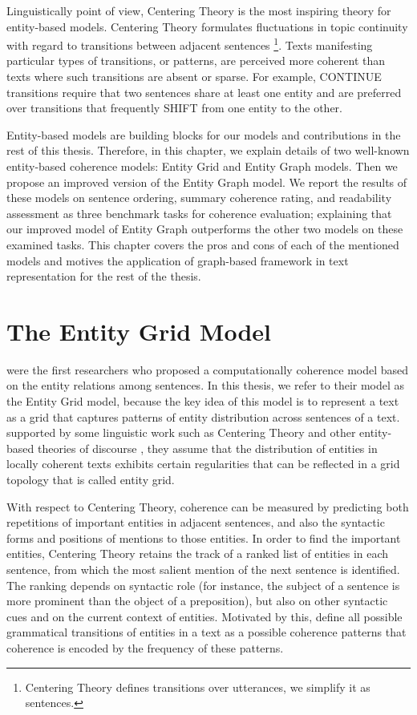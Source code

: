 Linguistically point of view, Centering Theory \cite{grosz95} is the most inspiring theory for entity-based models.  
Centering Theory formulates fluctuations in topic continuity with regard to transitions between adjacent sentences 
\footnote{Centering Theory defines transitions over utterances, we simplify it as sentences.}.
Texts manifesting particular types of transitions, or patterns, are perceived more coherent than texts where such transitions are absent or sparse. For example, CONTINUE transitions require that two sentences share at least one entity and are preferred
over transitions that frequently SHIFT from one entity to the other. 

Entity-based models are building blocks for our models and contributions in the rest of this thesis. 
Therefore, in this chapter, we explain details of two well-known entity-based coherence models: Entity Grid and Entity Graph models. 
Then we propose an improved version of the Entity Graph model.  
We report the results of these models on sentence ordering, summary coherence rating, and readability assessment as three benchmark tasks for coherence evaluation; explaining that our improved model of Entity Graph outperforms the other two models on these examined tasks. 
This chapter covers the pros and cons of each of the mentioned models and motives the application of graph-based framework in text representation for the rest of the thesis. 


\section{The Entity Grid Model}
\label{sec:ent_grid}
%
 were the first researchers who proposed a computationally coherence model based on the entity relations among sentences. 
In this thesis, we refer to their model as the Entity Grid model,  
because the key idea of this model is to represent a text as a grid that captures patterns of entity distribution across sentences of a text. 
supported by some linguistic work such as Centering Theory \cite{grosz95} and other entity-based theories of discourse \cite{givon87,prince81a}, they assume that the distribution of entities in locally coherent texts exhibits certain regularities that can be reflected in a grid topology that is called entity grid.

With respect to Centering Theory, coherence can be measured by predicting both repetitions of important entities in adjacent sentences, and also the syntactic forms and positions of mentions to those entities. 
In order to find the important entities, Centering Theory retains the track of a ranked list of entities in each sentence, from which the most salient mention of the next sentence is identified. 
The ranking depends on syntactic role (for instance, the subject of a sentence is more prominent than the object of a preposition), but also on other syntactic cues and on the current context of entities. 
Motivated by this,  define all possible grammatical transitions of entities in a text as a possible coherence patterns that coherence is encoded by the frequency of these patterns.


